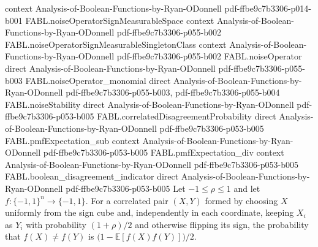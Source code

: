 \begin{theorem}
  {context}
  {Analysis-of-Boolean-Functions-by-Ryan-ODonnell}
  {pdf-ffbe9c7b3306-p014-b001}
\proofstep
  {FABL.noiseOperatorSignMeasurableSpace}
  {context}
  {Analysis-of-Boolean-Functions-by-Ryan-ODonnell}
  {pdf-ffbe9c7b3306-p055-b002}
\proofstep
  {FABL.noiseOperatorSignMeasurableSingletonClass}
  {context}
  {Analysis-of-Boolean-Functions-by-Ryan-ODonnell}
  {pdf-ffbe9c7b3306-p055-b002}
\proofstep
  {FABL.noiseOperator}
  {direct}
  {Analysis-of-Boolean-Functions-by-Ryan-ODonnell}
  {pdf-ffbe9c7b3306-p055-b003}
\proofstep
  {FABL.noiseOperator_monomial}
  {direct}
  {Analysis-of-Boolean-Functions-by-Ryan-ODonnell}
  {pdf-ffbe9c7b3306-p055-b003,
    pdf-ffbe9c7b3306-p055-b004}
\proofstep
  {FABL.noiseStability}
  {direct}
  {Analysis-of-Boolean-Functions-by-Ryan-ODonnell}
  {pdf-ffbe9c7b3306-p053-b005}
\proofstep
  {FABL.correlatedDisagreementProbability}
  {direct}
  {Analysis-of-Boolean-Functions-by-Ryan-ODonnell}
  {pdf-ffbe9c7b3306-p053-b005}
\proofstep
  {FABL.pmfExpectation_sub}
  {context}
  {Analysis-of-Boolean-Functions-by-Ryan-ODonnell}
  {pdf-ffbe9c7b3306-p053-b005}
\proofstep
  {FABL.pmfExpectation_div}
  {context}
  {Analysis-of-Boolean-Functions-by-Ryan-ODonnell}
  {pdf-ffbe9c7b3306-p053-b005}
\proofstep
  {FABL.boolean_disagreement_indicator}
  {direct}
  {Analysis-of-Boolean-Functions-by-Ryan-ODonnell}
  {pdf-ffbe9c7b3306-p053-b005}
Let $-1\le\rho\le1$ and let $f:\{-1,1\}^n\to\{-1,1\}$. For a correlated pair $(X,Y)$
formed by choosing $X$ uniformly from the sign cube and, independently in each
coordinate, keeping $X_i$ as $Y_i$ with probability $(1+\rho)/2$ and otherwise flipping
its sign, the probability that $f(X)\ne f(Y)$ is $\bigl(1-\mathbb{E}[f(X)f(Y)]\bigr)/2$.
\end{theorem}

